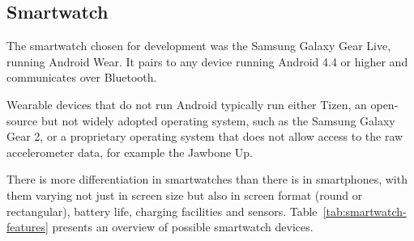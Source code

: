     
    \subsection{Smartwatch}
      \label{sec:smartwatch}
      The smartwatch chosen for development was the Samsung Galaxy Gear Live, running Android Wear.
      It pairs to any device running Android 4.4 or higher and communicates over Bluetooth.
      
      Wearable devices that do not run Android typically run either Tizen, an open-source but not 
      widely adopted operating system, such as the Samsung Galaxy Gear 2, or a proprietary 
      operating system that does not allow access to the raw accelerometer data, for example the 
      Jawbone Up.
      
      There is more differentiation in smartwatches than there is in smartphones, with them varying
      not just in screen size but also in screen format (round or rectangular), battery life,
      charging facilities and sensors. Table~\ref{tab:smartwatch-features} presents an overview of possible smartwatch devices.
      
